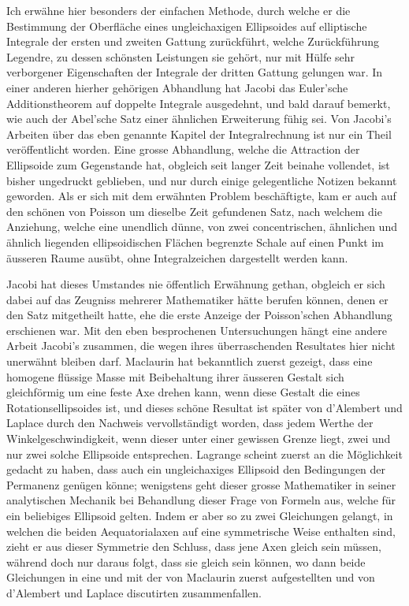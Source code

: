 \documentclass[11pt]{article}
\begin{document}
Ich erwähne hier besonders der einfachen Methode, durch welche er die Bestimmung der Oberfläche eines ungleichaxigen Ellipsoides auf elliptische Integrale der ersten und zweiten Gattung zurückführt, welche Zurückführung Legendre, zu dessen schönsten Leistungen sie gehört, nur mit Hülfe sehr verborgener Eigenschaften der Integrale der dritten Gattung gelungen war. In einer anderen hierher gehörigen Abhandlung hat Jacobi das Euler’sche Additionstheorem auf doppelte Integrale ausgedehnt, und bald darauf bemerkt, wie auch der Abel’sche Satz einer ähnlichen Erweiterung fühig sei. Von Jacobi’s Arbeiten über das eben genannte Kapitel der Integralrechnung ist nur ein Theil veröffentlicht worden. Eine grosse Abhandlung, welche die Attraction der Ellipsoide zum Gegenstande hat, obgleich seit langer Zeit beinahe vollendet, ist bisher ungedruckt geblieben, und nur durch einige gelegentliche Notizen bekannt geworden. Als er sich mit dem erwähnten Problem beschäftigte, kam er auch auf den schönen von Poisson um dieselbe Zeit gefundenen Satz, nach welchem die Anziehung, welche eine unendlich dünne, von zwei concentrischen, ähnlichen und ähnlich liegenden ellipsoidischen Flächen begrenzte Schale auf einen Punkt im äusseren Raume ausübt, ohne Integralzeichen dargestellt werden kann.

Jacobi hat dieses Umstandes nie öffentlich Erwähnung gethan, obgleich er sich dabei auf das Zeugniss mehrerer Mathematiker hätte berufen können, denen er den Satz mitgetheilt hatte, ehe die erste Anzeige der Poisson’schen Abhandlung erschienen war. Mit den eben besprochenen Untersuchungen hängt eine andere Arbeit Jacobi's zusammen, die wegen ihres überraschenden Resultates hier nicht unerwähnt bleiben darf. Maclaurin hat bekanntlich zuerst gezeigt, dass eine homogene flüssige Masse mit Beibehaltung ihrer äusseren Gestalt sich gleichförmig um eine feste Axe drehen kann, wenn diese Gestalt die eines Rotationsellipsoides ist, und dieses schöne Resultat ist später von d’Alembert und Laplace durch den Nachweis vervollständigt worden, dass jedem Werthe der Winkelgeschwindigkeit, wenn dieser unter einer gewissen Grenze liegt, zwei und nur zwei solche Ellipsoide entsprechen. Lagrange scheint zuerst an die Möglichkeit gedacht zu haben, dass auch ein ungleichaxiges Ellipsoid den Bedingungen der Permanenz genügen könne; wenigstens geht dieser grosse Mathematiker in seiner analytischen Mechanik bei Behandlung dieser Frage von Formeln aus, welche für ein beliebiges Ellipsoid gelten. Indem er aber so zu zwei Gleichungen gelangt, in welchen die beiden Aequatorialaxen auf eine symmetrische Weise enthalten sind, zieht er aus dieser Symmetrie den Schluss, dass jene Axen gleich sein müssen, während doch nur daraus folgt, dass sie gleich sein können, wo dann beide Gleichungen in eine und mit der von Maclaurin zuerst aufgestellten und von d’Alembert und Laplace discutirten zusammenfallen.
\end{document}

